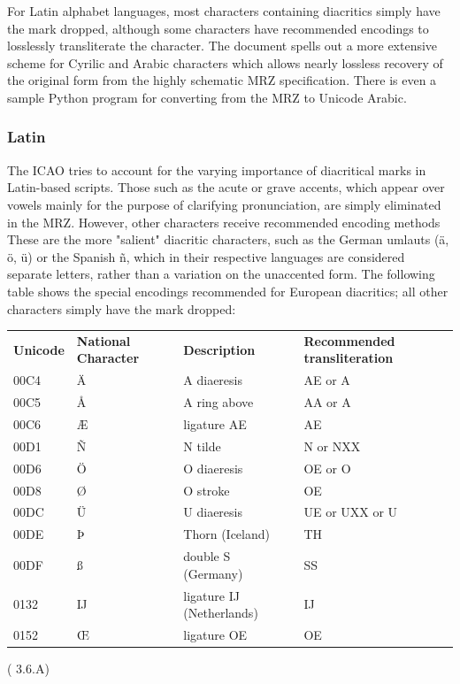 For Latin alphabet languages, most characters containing diacritics simply have
the mark dropped, although some characters have recommended encodings to
losslessly transliterate the character. The document spells out a more extensive
scheme for Cyrilic and Arabic characters which allows nearly lossless recovery
of the original form from the highly schematic MRZ specification. There is even
a sample Python program for converting from the MRZ to Unicode Arabic.

\subsubsection{Latin}

The ICAO tries to account for the varying importance of diacritical marks in
Latin-based scripts. Those such as the acute or grave accents, which appear over
vowels mainly for the purpose of clarifying pronunciation, are simply eliminated
in the MRZ. However, other characters receive recommended encoding methods These
are the more "salient" diacritic characters, such as the German umlauts (ä, ö,
ü) or the Spanish ñ, which in their respective languages are considered separate
letters, rather than a variation on the unaccented form. The following table
shows the special encodings recommended for European diacritics; all other
characters simply have the mark dropped:

\begin{tabular}{l|l|l|l}
\textbf{Unicode} & \textbf{National Character} & \textbf{Description} &
\textbf{Recommended transliteration} \\
00C4 & Ä & A diaeresis & AE or A \\
00C5 & Å & A ring above & AA or A \\
00C6 & Æ & ligature AE & AE \\
00D1 & Ñ & N tilde & N or NXX \\
00D6 & Ö & O diaeresis & OE or O \\
00D8 & Ø & O stroke & OE \\
00DC & Ü & U diaeresis & UE or UXX or U \\
00DE & Þ & Thorn (Iceland) & TH \\
00DF & ß & double S (Germany) & SS \\
0132 & Ĳ & ligature IJ (Netherlands) & IJ \\
0152 & Œ & ligature OE & OE \\
\end{tabular} (\parencite{ICAO9303} 3.6.A)

